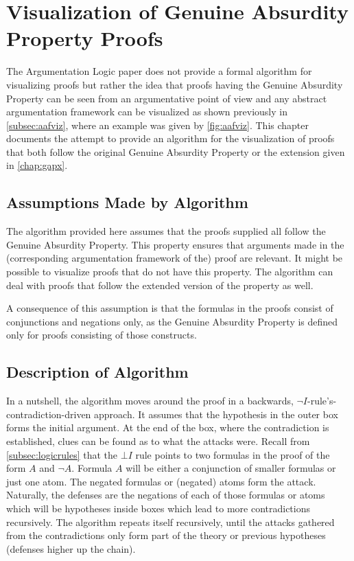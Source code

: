 \documentclass[11pt,twoside,a4paper]{report}
\begin{document}
\chapter{Visualization of Genuine Absurdity Property Proofs}
\label{chap:viz}
The Argumentation Logic paper does not provide a formal algorithm for visualizing proofs but rather the idea that proofs having the Genuine Absurdity Property can be seen from an argumentative point of view and any abstract argumentation framework can be visualized as shown previously in \autoref{subsec:aafviz}, where an example was given by \autoref{fig:aafviz}. This chapter documents the attempt to provide an algorithm for the visualization of proofs that both follow the original Genuine Absurdity Property or the extension given in \autoref{chap:gapx}.

\section{Assumptions Made by Algorithm}
The algorithm provided here assumes that the proofs supplied all follow the Genuine Absurdity Property. This property ensures that arguments made in the (corresponding argumentation framework of the) proof are relevant. It might be possible to visualize proofs that do not have this property. The algorithm can deal with proofs that follow the extended version of the property as well.

A consequence of this assumption is that the formulas in the proofs consist of conjunctions and negations only, as the Genuine Absurdity Property is defined only for proofs consisting of those constructs.

\section{Description of Algorithm}
\label{sec:vizalg}
In a nutshell, the algorithm moves around the proof in a backwards, $\neg I$-rule's-contradiction-driven approach. It assumes that the hypothesis in the outer box forms the initial argument. At the end of the box, where the contradiction is established, clues can be found as to what the attacks were. Recall from \autoref{subsec:logicrules} that the $\bot I$ rule points to two formulas in the proof of the form $A$ and $\neg A$. Formula $A$ will be either a conjunction of smaller formulas or just one atom. The negated formulas or (negated) atoms form the attack. Naturally, the defenses are the negations of each of those formulas or atoms which will be hypotheses inside boxes which lead to more contradictions recursively. The algorithm repeats itself recursively, until the attacks gathered from the contradictions only form part of the theory or previous hypotheses (defenses higher up the chain).
\end{document}
